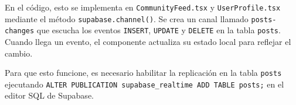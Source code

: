 \documentclass[12pt,a4paper]{article}
\begin{document}
En el código, esto se implementa en \texttt{CommunityFeed.tsx} y \texttt{UserProfile.tsx} mediante el método \texttt{supabase.channel()}. Se crea un canal llamado \texttt{posts-changes} que escucha los eventos \texttt{INSERT}, \texttt{UPDATE} y \texttt{DELETE} en la tabla \texttt{posts}. Cuando llega un evento, el componente actualiza su estado local para reflejar el cambio.

Para que esto funcione, es necesario habilitar la replicación en la tabla \texttt{posts} ejecutando \texttt{ALTER PUBLICATION supabase\_realtime ADD TABLE posts;} en el editor SQL de Supabase.
\end{document}
